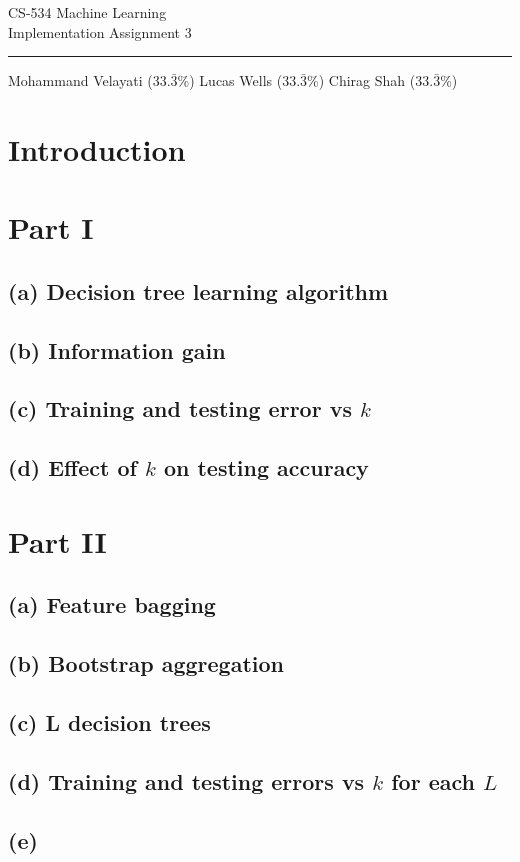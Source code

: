 \documentclass{article}
\begin{document}
\begin{center}
	{\huge CS-534 Machine Learning} \\ \vspace{2mm}
	{\Large Implementation Assignment 3} \\ \vspace{2mm} \hrule \vspace{3mm}
	{\normalsize Mohammand Velayati ($33.\bar{3}$\%) \hspace{3mm}  Lucas Wells ($33.\bar{3}$\%) \hspace{3mm}  Chirag Shah ($33.\bar{3}$\%)}
\end{center}

\section{Introduction}

\section{Part I}

\subsection{(a) Decision tree learning algorithm}

\subsection{(b) Information gain}

\subsection{(c) Training and testing error vs $k$}

\subsection{(d) Effect of $k$ on testing accuracy}

\section{Part II}

\subsection{(a) Feature bagging}

\subsection{(b) Bootstrap aggregation}

\subsection{(c) L decision trees}

\subsection{(d) Training and testing errors vs $k$ for each $L$}

\subsection{(e) }
\end{document}
